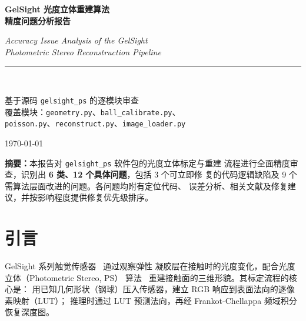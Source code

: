 \documentclass[12pt, a4paper]{ctexart}
\begin{document}
\begin{titlepage}
  \centering
  \vspace*{2cm}
  {\LARGE\bfseries GelSight 光度立体重建算法\\[0.4em]精度问题分析报告\par}
  \vspace{0.6em}
  {\large\itshape Accuracy Issue Analysis of the GelSight\\
   Photometric Stereo Reconstruction Pipeline\par}
  \vspace{2em}
  \rule{0.6\linewidth}{0.4pt}\\[1em]
  {\normalsize 基于源码 \texttt{gelsight\_ps} 的逐模块审查\\[0.3em]
   覆盖模块：\texttt{geometry.py}、\texttt{ball\_calibrate.py}、\\
   \texttt{poisson.py}、\texttt{reconstruct.py}、\texttt{image\_loader.py}\par}
  \vspace{2em}
  {\normalsize\today}
  \vfill
  \begin{tcolorbox}[colback=gray!8, colframe=gray!50, width=0.85\linewidth,
                    boxrule=0.5pt, left=8pt, right=8pt]
    \small\textbf{摘要：}本报告对 \texttt{gelsight\_ps} 软件包的光度立体标定与重建
    流程进行全面精度审查，识别出 \textbf{6 类、12 个具体问题}，包括 3 个可立即修
    复的代码逻辑缺陷及 9 个需算法层面改进的问题。各问题均附有定位代码、
    误差分析、相关文献及修复建议，并按影响程度提供修复优先级排序。
  \end{tcolorbox}
\end{titlepage}

\tableofcontents
\newpage

\section{引言}
\label{sec:intro}

GelSight 系列触觉传感器~\cite{johnson2009retrographic,yuan2017gelsight} 通过观察弹性
凝胶层在接触时的光度变化，配合光度立体（Photometric Stereo, PS）
算法~\cite{woodham1980photometric} 重建接触面的三维形貌。其标定流程的核心是：
用已知几何形状（钢球）压入传感器，建立 RGB 响应到表面法向的逐像素映射（LUT）；
推理时通过 LUT 预测法向，再经 Frankot-Chellappa 频域积分~\cite{frankot1988method}
恢复深度图。
\end{document}
